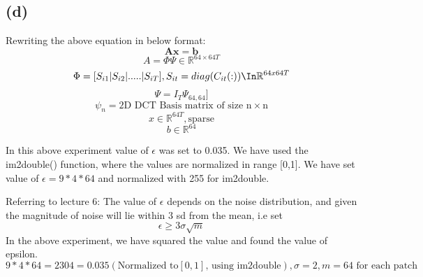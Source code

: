 \documentclass{article}
\begin{document}
\subsection{(d)}
Rewriting the above equation in below format: 
$$ \mathbf{Ax = b}$$
$$A = \Phi \Psi \in \mathbb{R}^{64\times64T} $$
$$\Phi =  [ S_{i1}| S_{i2}|.....| S_{iT}], S_{it} = diag(C_{it} (:)) \In \mathbb{R} ^{64x64T}$$
$$\Psi = I_T \Psi_{64, 64}]$$
$$\psi_n = \text{2D DCT Basis matrix of size n}\times \text{n}$$
$$x \in \mathbb{R}^{64T} ,  \text{sparse}$$
$$b \in \mathbb{R}^{64}$$

In this above experiment value of $\epsilon$ was set to 0.035. We have used the im2double() function, where the values are normalized in range [0,1]. We have set value of $\epsilon = 9*4*64$ and normalized with 255 for im2double.

Referring to lecture 6:
The value of $\epsilon$ depends on the noise distribution, and given the magnitude of noise will lie within 3 sd from the mean, 
i.e set $$  \epsilon \ge 3 \sigma \sqrt{m}$$
In the above experiment, we have squared the value and found the value of epsilon.
$$9*4*64 = 2304 = 0.035(\text{Normalized to} [0,1]\text{, using im2double}), \sigma = 2, m = 64 \text{ for each patch}$$

\newpage
\end{document}
